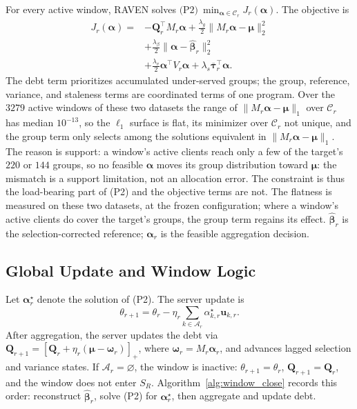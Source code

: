 \documentclass[letterpaper,journal]{IEEEtran}
\begin{document}
For every active window, RAVEN solves
$\text{(P2)}\ \min_{\boldsymbol\alpha\in\mathcal{C}_r}J_r(\boldsymbol\alpha)$.
The objective is
\begin{align}
 J_r(\boldsymbol\alpha)
 ={}&-\mathbf{Q}_r^{\top}M_r\boldsymbol\alpha
 +\frac{\lambda_g}{2}
 \|M_r\boldsymbol\alpha-\boldsymbol\mu\|_2^2
 \nonumber\\
 &+\frac{\lambda_{\beta}}{2}
 \|\boldsymbol\alpha-\widehat{\boldsymbol\beta}_r\|_2^2
 \nonumber\\
 &+\frac{\lambda_v}{2}
 \boldsymbol\alpha^{\top}V_r\boldsymbol\alpha
 +\lambda_s\overline{\boldsymbol\tau}_r^{\top}\boldsymbol\alpha.
\label{eq:P2_objective}
\end{align}
The debt term prioritizes accumulated under-served groups; the group,
reference, variance, and staleness terms are coordinated terms of one
program.  Over the $3279$ active windows of these two datasets the range of
$\|M_r\boldsymbol\alpha-\boldsymbol\mu\|_1$ over $\mathcal{C}_r$ has median
$10^{-13}$, so the $\ell_1$ surface is flat, its minimizer over $\mathcal{C}_r$
not unique, and the group term only selects among the solutions equivalent in
$\|M_r\boldsymbol\alpha-\boldsymbol\mu\|_1$.  The reason is support: a window's
active clients reach only a few of the target's $220$ or $144$ groups, so no
feasible $\boldsymbol\alpha$ moves its group distribution toward
$\boldsymbol\mu$: the mismatch is a support limitation, not an allocation
error.  The constraint is thus the load-bearing part of (P2) and the objective
terms are not.  The flatness is measured on these two datasets, at the frozen
configuration; where a window's active clients do cover the target's groups, the
group term regains its effect.
$\widehat{\boldsymbol\beta}_r$ is the selection-corrected reference;
$\boldsymbol\alpha_r$ is the feasible aggregation decision.

\subsection{Global Update and Window Logic}
\label{subsec:global_update}

Let $\boldsymbol\alpha_r^\star$ denote the solution of (P2).  The server update
is
\begin{equation}
 \theta_{r+1}
 =
 \theta_r
 -
 \eta_r
 \sum_{k\in\mathcal{A}_r}
 \alpha^\star_{k,r}\mathbf{u}_{k,r}.
 \label{eq:server_update}
\end{equation}
After aggregation, the server updates the debt via
$\mathbf{Q}_{r+1}=\left[\mathbf{Q}_r+\eta_r(\boldsymbol\mu-\boldsymbol\omega_r)\right]_+$,
where $\boldsymbol\omega_r=M_r\boldsymbol\alpha_r$, and advances lagged
selection and variance states.  If $\mathcal{A}_r=\varnothing$, the
window is inactive: $\theta_{r+1}=\theta_r$, $\mathbf{Q}_{r+1}=\mathbf{Q}_r$,
and the window does not enter $S_R$.  Algorithm~\ref{alg:window_close}
records this order: reconstruct $\widehat{\boldsymbol\beta}_r$, solve (P2) for
$\boldsymbol\alpha_r^\star$, then aggregate and update debt.
\end{document}
